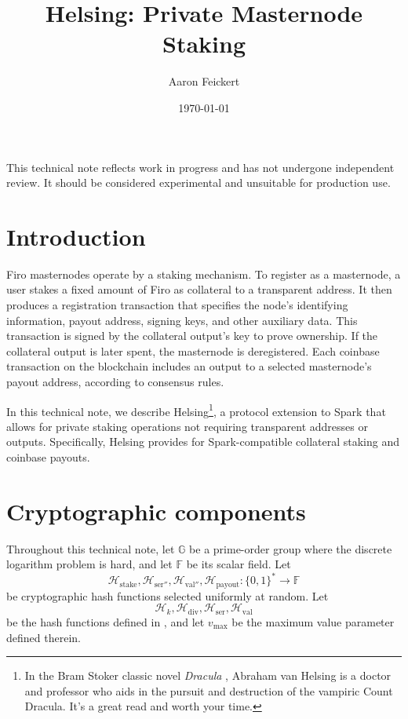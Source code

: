 \documentclass{article}
\title{Helsing: Private Masternode Staking}
\author{Aaron Feickert}
\date{\today}
\newcommand{\G}{\mathbb{G}}
\newcommand{\F}{\mathbb{F}}
\newcommand{\hash}{\mathcal{H}}
\theoremstyle{remark}
\begin{document}
\maketitle

This technical note reflects work in progress and has not undergone independent review.
It should be considered experimental and unsuitable for production use.

\section{Introduction}

Firo masternodes operate by a staking mechanism.
To register as a masternode, a user stakes a fixed amount of Firo as collateral to a transparent address.
It then produces a registration transaction that specifies the node's identifying information, payout address, signing keys, and other auxiliary data.
This transaction is signed by the collateral output's key to prove ownership.
If the collateral output is later spent, the masternode is deregistered.
Each coinbase transaction on the blockchain includes an output to a selected masternode's payout address, according to consensus rules.

In this technical note, we describe Helsing\footnote{In the Bram Stoker classic novel \textit{Dracula} \cite{dracula}, Abraham van Helsing is a doctor and professor who aids in the pursuit and destruction of the vampiric Count Dracula. It's a great read and worth your time.}, a protocol extension to Spark \cite{spark} that allows for private staking operations not requiring transparent addresses or outputs.
Specifically, Helsing provides for Spark-compatible collateral staking and coinbase payouts.


\section{Cryptographic components}

Throughout this technical note, let $\G$ be a prime-order group where the discrete logarithm problem is hard, and let $\F$ be its scalar field.
Let $$\hash_{\text{stake}},\hash_{\text{ser}''}, \hash_{\text{val}''}, \hash_{\text{payout}}: \{0,1\}^* \to \F$$ be cryptographic hash functions selected uniformly at random.
Let $$\hash_k, \hash_{\text{div}}, \hash_{\text{ser}}, \hash_{\text{val}}$$ be the hash functions defined in \cite{spark}, and let $v_{\text{max}}$ be the maximum value parameter defined therein.
\end{document}
